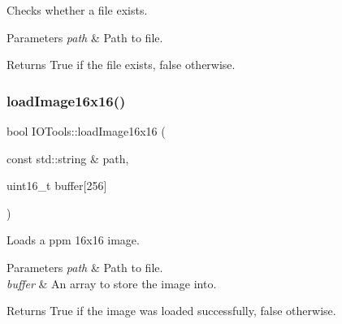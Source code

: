 Checks whether a file exists. 


\begin{DoxyParams}{Parameters}
{\em path} & Path to file. \\
\hline
\end{DoxyParams}
\begin{DoxyReturn}{Returns}
True if the file exists, false otherwise. 
\end{DoxyReturn}
\mbox{\label{namespaceIOTools_a16f1ccfbedc7a4a792ffcbf3d8f0a148}} 
\subsubsection{\texorpdfstring{load\+Image16x16()}{loadImage16x16()}}
{\footnotesize\ttfamily bool I\+O\+Tools\+::load\+Image16x16 (\begin{DoxyParamCaption}\item[{const std\+::string \&}]{path,  }\item[{uint16\+\_\+t}]{buffer\mbox{[}256\mbox{]} }\end{DoxyParamCaption})}



Loads a ppm 16x16 image. 


\begin{DoxyParams}{Parameters}
{\em path} & Path to file. \\
\hline
{\em buffer} & An array to store the image into. \\
\hline
\end{DoxyParams}
\begin{DoxyReturn}{Returns}
True if the image was loaded successfully, false otherwise. 
\end{DoxyReturn}
